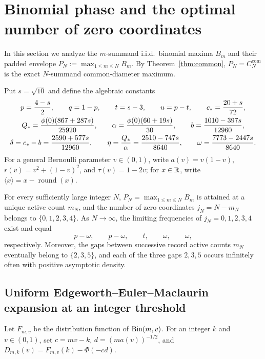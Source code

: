 \section{Binomial phase and the optimal number of zero coordinates}
\label{sec:iid-phase}

In this section we analyze the $m$-summand i.i.d.\ binomial maxima $B_m$ and
their padded envelope $P_N:=\max_{1\le m\le N}B_m$. By Theorem~\ref{thm:common},
$P_N=C_N^{\mathrm{com}}$ is the exact $N$-summand common-diameter maximum.

Put $s=\sqrt{10}$ and define the algebraic constants
\begin{equation}\label{eq:phase-constants}
\begin{gathered}
 p=\frac{4-s}2,\qquad q=1-p,\qquad t=s-3,\qquad u=p-t,
 \qquad c_*=\frac{20+s}{72},\\
 Q_*=\frac{\phi(0)(867+287s)}{25920},\qquad
 \alpha=\frac{\phi(0)(60+19s)}{30},\qquad
 b=\frac{1010-397s}{12960},\\
 \delta=c_*-b=\frac{2590+577s}{12960},\qquad
 \eta=\frac{Q_*}\alpha=\frac{2510-747s}{8640},\qquad
 \omega=\frac{7773-2447s}{8640}.
\end{gathered}
\end{equation}
For a general Bernoulli parameter $v\in(0,1)$, write $a(v)=v(1-v)$,
$r(v)=v^2+(1-v)^2$, and $\tau(v)=1-2v$; for $x\in\mathbb R$, write
$\langle x\rangle=x-\operatorname{round}(x)$.

\begin{theorem}\label{thm:iid-padding}
For every sufficiently large integer $N$, $P_N=\max_{1\le m\le N}B_m$ is
attained at a unique active count $m_N$, and the number of zero coordinates
$j_N=N-m_N$ belongs to $\{0,1,2,3,4\}$. As $N\to\infty$, the limiting
frequencies of $j_N=0,1,2,3,4$ exist and equal
\[
 p-\omega,\qquad p-\omega,\qquad t,\qquad\omega,\qquad\omega,
\]
respectively. Moreover, the gaps between successive record active counts
$m_N$ eventually belong to $\{2,3,5\}$, and each of the three gaps $2,3,5$
occurs infinitely often with positive asymptotic density.
\end{theorem}

\subsection{Uniform Edgeworth--Euler--Maclaurin expansion at an integer threshold}

Let $F_{m,v}$ be the distribution function of $\operatorname{Bin}(m,v)$. For an integer
$k$ and $v\in(0,1)$, set $c=mv-k$, $d=(ma(v))^{-1/2}$, and
$D_{m,k}(v)=F_{m,v}(k)-\Phi(-cd)$.

